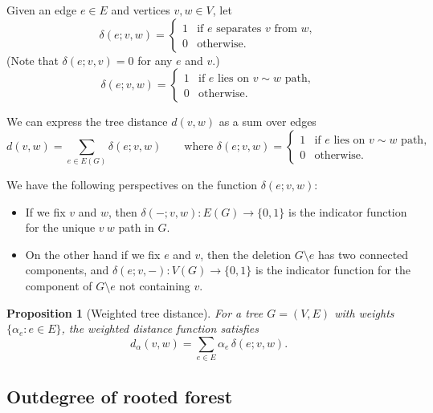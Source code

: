 \documentclass{amsart}
\newtheorem{prop}[thm]{Proposition}
\theoremstyle{definition}
\begin{document}
Given an edge $e\in E$ and vertices $v,w \in V$, let 
\begin{equation}
\delta(e;v,w) = \begin{cases}
  1 &\text{if $e$ separates  $v$ from $w$}, \\
  0 &\text{otherwise}.
  \end{cases}
\end{equation}
(Note that $\delta(e; v,v) = 0$ for any $e$ and $v$.)
\begin{equation}
\delta(e; v,w) = \begin{cases}
1 &\text{if $e$ lies on $v\sim w$ path}, \\
0 &\text{otherwise}.
\end{cases}
\end{equation}

We can express the tree distance $d(v,w)$ as a sum over edges
\begin{equation*}
d(v,w) = \sum_{e \in E(G)} \delta(e; v,w)
\qquad\text{where } \delta(e; v,w) = \begin{cases}
1 &\text{if $e$ lies on $v\sim w$ path}, \\
0 &\text{otherwise}.
\end{cases}
\end{equation*}

We have the following perspectives on the function $\delta(e; v,w)$:
\begin{itemize}
\item 
If we fix $v$ and $w$, then $\delta(-;v,w) : E(G) \to \{0,1\}$
is the indicator function for the unique $v~ w$ path in $G$.

\item 
On the other hand if we fix $e$ and $v$,
then the deletion $G\setminus e$ has two connected components,
and $\delta(e;v, -) : V(G) \to \{0,1\}$ 
is the indicator function for the component of $G \setminus e$ not containing $v$.
\end{itemize}


\begin{prop}[Weighted tree distance]
\label{prop:distance-sum}
For a tree $G = (V,E)$ with weights $\{\alpha_e : e \in E\}$,
the weighted distance function satisfies
\[ d_\alpha(v,w) = \sum_{e \in E} \alpha_e \, \delta(e; v,w) .\]
\end{prop}


\subsection{Outdegree of rooted forest}
\end{document}
